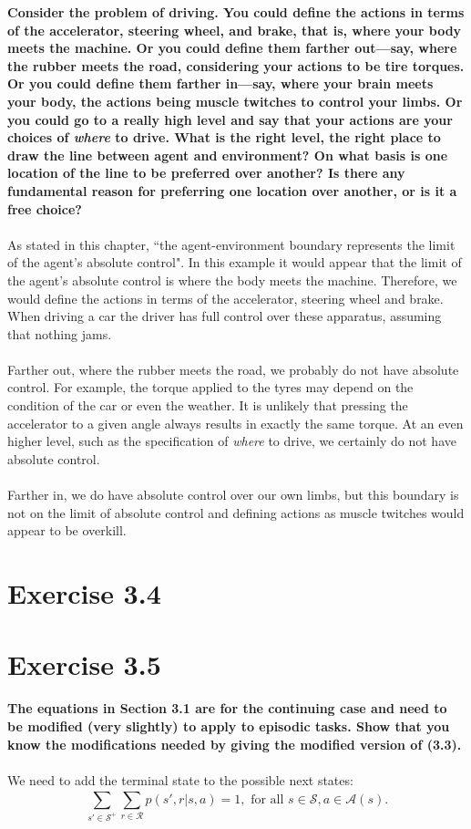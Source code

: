 \documentclass[a4paper,11pt]{article}
\numberwithin{equation}{section}
\theoremstyle{remark}
\begin{document}
\textbf{Consider the problem of driving. You could define the actions in terms of the accelerator, steering wheel, and brake, that is, where your body meets the machine. Or you could define them farther out—say, where the rubber meets the road, considering your actions to be tire torques. Or you could define them farther in—say, where your brain meets your body, the actions being muscle twitches to control your limbs. Or you could go to a really high level and say that your actions are your choices of \emph{where} to drive. What is the right level, the right place to draw the line between agent and environment? On what basis is one location of the line to be preferred over another? Is there any fundamental reason for preferring one location over another, or is it a free choice?}
\\ \\
As stated in this chapter, ``the agent-environment boundary represents the limit of the agent's absolute control". In this example it would appear that the limit of the agent's absolute control is where the body meets the machine. Therefore, we would define the actions in terms of the accelerator, steering wheel and brake. When driving a car the driver has full control over these apparatus, assuming that nothing jams. 
\\ \\
Farther out, where the rubber meets the road, we probably do not have absolute control. For example, the torque applied to the tyres may depend on the condition of the car or even the weather. It is unlikely that pressing the accelerator to a given angle always results in exactly the same torque. At an even higher level, such as the specification of \emph{where} to drive, we certainly do not have absolute control.
\\ \\
Farther in, we do have absolute control over our own limbs, but this boundary is not on the limit of absolute control and defining actions as muscle twitches would appear to be overkill. 

\section{Exercise 3.4}

\section{Exercise 3.5}

\textbf{The equations in Section 3.1 are for the continuing case and need to be modified (very slightly) to apply to episodic tasks. Show that you know the modifications needed by giving the modified version of (3.3).}
\\ \\
We need to add the terminal state to the possible next states:
\[
	\sum_{s' \in \mathcal{S}^+}^{} \sum_{r \in \mathcal{R}}^{} p(s', r | s, a) = 1, \text{ for all } s \in \mathcal{S}, a \in \mathcal{A}(s).
\]
\end{document}
